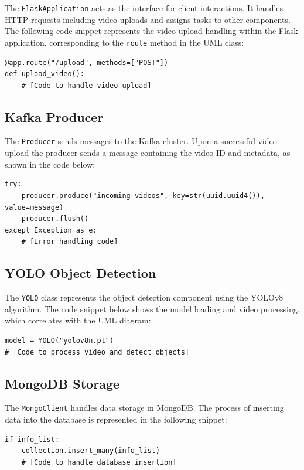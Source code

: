 The \texttt{FlaskApplication} acts as the interface for client interactions. It handles HTTP requests including video uploads and assigns tasks to other components. The following code snippet represents the video upload handling within the Flask application, corresponding to the \texttt{route} method in the UML class:

\begin{verbatim}
@app.route("/upload", methods=["POST"])
def upload_video():
    # [Code to handle video upload]
\end{verbatim}

\subsection{Kafka Producer}

The \texttt{Producer} sends messages to the Kafka cluster. Upon a successful video upload the producer sends a message containing the video ID and metadata, as shown in the code below:

\begin{verbatim}
try:
    producer.produce("incoming-videos", key=str(uuid.uuid4()), value=message)
    producer.flush()
except Exception as e:
    # [Error handling code]
\end{verbatim}

\subsection{YOLO Object Detection}

The \texttt{YOLO} class represents the object detection component using the YOLOv8 algorithm. The code snippet below shows the model loading and video processing, which correlates with the UML diagram:

\begin{verbatim}
model = YOLO("yolov8n.pt")
# [Code to process video and detect objects]
\end{verbatim}

\subsection{MongoDB Storage}

The \texttt{MongoClient} handles data storage in MongoDB. The process of inserting data into the database is represented in the following snippet:

\begin{verbatim}
if info_list:
    collection.insert_many(info_list)
    # [Code to handle database insertion]
\end{verbatim}

